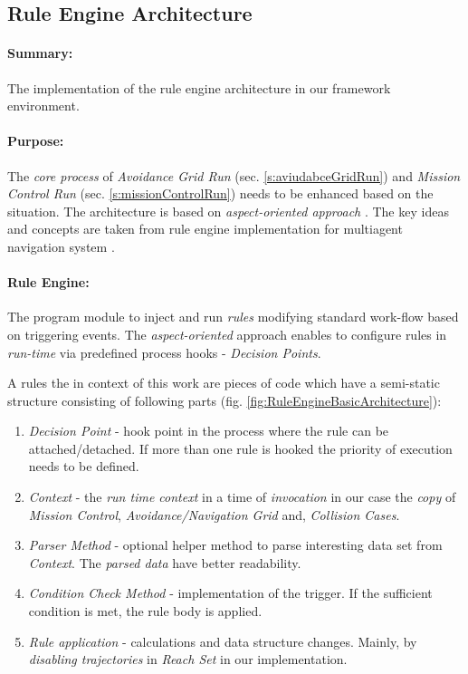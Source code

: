 \subsection{Rule Engine Architecture}\label{s:RuleEngineArchitecture}

\paragraph{Summary:} The implementation of the rule engine architecture in our framework environment. 

\paragraph{Purpose:} The \emph{core process} of \emph{Avoidance Grid Run} (sec. \ref{s:aviudabceGridRun}) and \emph{Mission Control Run} (sec. \ref{s:missionControlRun}) needs to be enhanced based on  the situation. The architecture is based on \emph{aspect-oriented approach} \cite{hill2003jess}. The key ideas and concepts are taken from rule engine implementation for multiagent  navigation system \cite{seyboth2013event}.



\paragraph{Rule Engine:} The program module to inject and run \emph{rules} modifying standard work-flow based on  triggering events. The \emph{aspect-oriented} approach enables to configure rules in \emph{run-time} via predefined process hooks - \emph{Decision Points}. 

\noindent A rules the in context of this work are pieces of code which have a semi-static structure consisting of following parts (fig. \ref{fig:RuleEngineBasicArchitecture}):

\begin{enumerate}
    \item \emph{Decision Point} - hook point in the process where the rule can be attached/detached. If more than one rule is hooked the priority of execution needs to be defined. 
    
    \item \emph{Context} - the \emph{run time context} in a time of \emph{invocation} in our case the \emph{copy} of \emph{Mission Control}, \emph{Avoidance/Navigation Grid} and,  \emph{Collision Cases}.
    
    \item \emph{Parser Method} - optional helper method to parse interesting data set from \emph{Context}. The \emph{parsed data} have better readability.
    
    \item \emph{Condition Check Method} - implementation of the trigger. If the sufficient condition is met, the rule body is applied.
    
    \item \emph{Rule application} - calculations and data structure changes. Mainly, by  \emph{disabling trajectories} in \emph{Reach Set} in our implementation.     
\end{enumerate}

